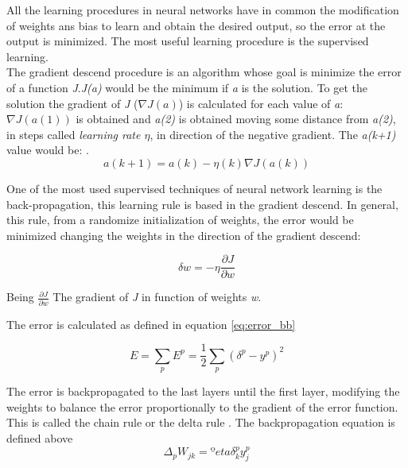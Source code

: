 All the learning procedures in neural networks have in common the modification of weights ans bias to learn and obtain the desired output, so the error at the output is minimized. The most useful learning procedure is the supervised learning.\\

The gradient descend procedure is an algorithm whose goal is minimize the error of a function \textit{J}.\textit{J(a)} would be the minimum if \textit{a} is the solution. To get the solution the gradient of \textit{J} ($\nabla J(a)$) is calculated for each value of \textit{a}: $\nabla J(a(1))$ is obtained and \textit{a(2)} is obtained moving some distance from \textit{a(2)}, in steps called \textit{learning rate $\eta$}, in direction of the negative gradient. The \textit{a(k+1)} value would be: \cite{Duda}.\\


\begin{equation}
a(k+1) = a(k) - \eta (k) \nabla J(a(k))
\end{equation}

One of the most used supervised techniques of neural network learning is the back-propagation, this learning rule is based in the gradient descend. In general, this rule, from a randomize initialization of weights, the error would be minimized changing the weights in the direction of the gradient descend:

\begin{equation}
\delta w = -\eta\frac{\partial J}{\partial w}
\end{equation}

Being $\frac{\partial J}{\partial w}$ The gradient of \textit{J} in function of weights \textit{w}.

The error is calculated as defined in equation \ref{eq:error_bb}

\begin{equation}
E=\sum_{p}E^p = \frac{1}{2}\sum_{p}(\delta^p- y^p)^2
\end{equation} \label{eq:error_bb}

The error is backpropagated to the last layers until the first layer, modifying the weights to balance the error proportionally to the gradient of the error function. This is called the chain rule or the delta rule \cite{Duda, BINN, krose}. The backpropagation equation is defined above\\

			\begin{equation}
			\Delta_{p}W_{jk}=ºeta \delta _{k}^{p}y_{j}^{p}
			\label{eq:ecuation_back1}
			\end{equation}\\

